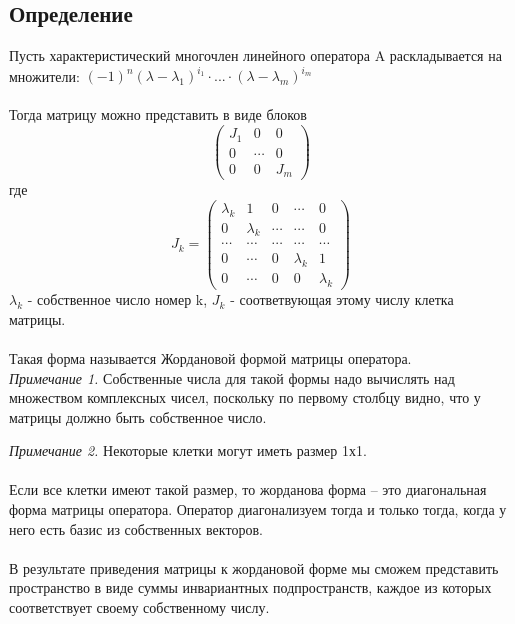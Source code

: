 \documentclass[12pt]{article}
\begin{document}
\subsection{Определение}

Пусть характеристический многочлен линейного оператора A раскладывается на множители:
\((-1)^n(\lambda-\lambda_1)^{i_1}\cdot...\cdot(\lambda-\lambda_m)^{i_m}\)\\\\
Тогда матрицу можно представить в виде блоков
\[
    \begin{pmatrix}
        J_1 & 0      & 0   \\
        0   & \cdots & 0   \\
        0   & 0      & J_m
    \end{pmatrix}
\] где
\[
    J_k = \begin{pmatrix}
        \lambda_k & 1         & 0      & \cdots    & 0         \\
        0         & \lambda_k & \cdots & \cdots    & 0         \\
        \cdots    & \cdots    & \cdots & \cdots    & \cdots    \\
        0         & \cdots    & 0      & \lambda_k & 1         \\
        0         & \cdots    & 0      & 0         & \lambda_k
    \end{pmatrix}
\]
$\lambda_k$ - собственное число номер k, $J_k$ - соответвующая этому числу клетка матрицы.\\\\
Такая форма называется Жордановой формой матрицы оператора. \\

\textit{Примечание 1.} Собственные числа для такой формы надо вычислять над множеством комплексных чисел,
поскольку по первому столбцу видно, что у матрицы должно быть собственное число.

\textit{Примечание 2.} Некоторые клетки могут иметь размер 1х1. \\\\
Если все клетки имеют такой размер, то жорданова форма – это диагональная форма матрицы оператора.
Оператор диагонализуем тогда и только тогда, когда у него есть базис из собственных векторов. \\\\
В результате приведения матрицы к жордановой форме мы сможем представить пространство в виде суммы
инвариантных подпространств, каждое из которых соответствует своему собственному числу.
\end{document}
